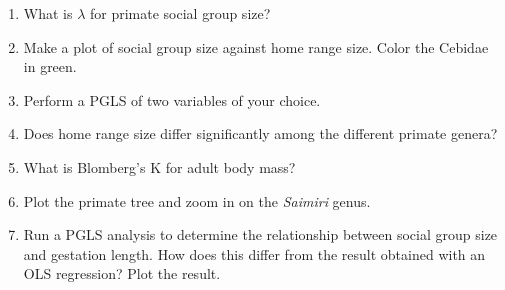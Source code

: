 \documentclass[12pt]{article}
\begin{document}
\begin{enumerate}
\item What is $\lambda$ for primate social group size?
\item Make a plot of social group size against home range size. Color the Cebidae in green. 
\item Perform a PGLS of two variables of your choice.
\item Does home range size differ significantly among the different primate genera?
\item What is Blomberg’s K for adult body mass?
\item Plot the primate tree and zoom in on the \textit{Saimiri} genus.
\item Run a PGLS analysis to determine the relationship between social group size and gestation length. How does this differ from the result obtained with an OLS regression? Plot the result.
\end{enumerate}
\end{document}
